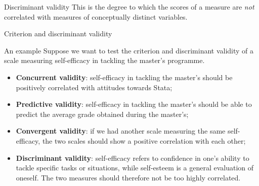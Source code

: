 \documentclass{beamer}
\begin{document}
\begin{frame}{Discriminant validity}
    This is the degree to which the scores of a measure are \textit{not} correlated with measures of conceptually distinct variables.
\end{frame}

\begin{frame}{Criterion and discriminant validity}
    \small
    \begin{block}{An example}
    Suppose we want to test the criterion and discriminant validity of a scale measuring self-efficacy in tackling the master's programme.
        \begin{itemize}
            \item \textbf{Concurrent validity}: self-efficacy in tackling the master's should be positively correlated with attitudes towards Stata;
            \item \textbf{Predictive validity}: self-efficacy in tackling the master's should be able to predict the average grade obtained during the master's;
            \item \textbf{Convergent validity}: if we had another scale measuring the same self-efficacy, the two scales should show a positive correlation with each other;
            \item \textbf{Discriminant validity}: self-efficacy refers to confidence in one's ability to tackle specific tasks or situations, while self-esteem is a general evaluation of oneself. The two measures should therefore not be too highly correlated.
        \end{itemize}
    \end{block}
\end{frame}
\end{document}
